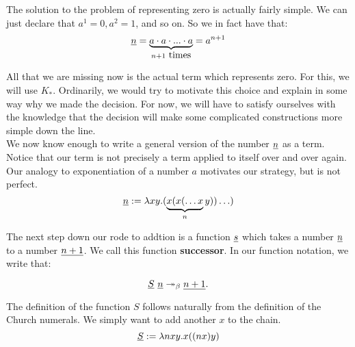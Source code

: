 The solution to the problem of representing zero is actually fairly simple. We can just declare that $a^1 = 0, a^2 = 1$, and so on. So we in fact have that:\\

\begin{equation*}
  \uline{n} = \underbrace{a \cdot a \cdot ... \cdot a}_{n+1\hbox{ times}} = a^{n+1}
\end{equation*}

All that we are missing now is the actual term which represents zero. For this, we will use $K_*$. Ordinarily, we would try to motivate this choice and explain in some way why we made the decision. For now, we will have to satisfy ourselves with the knowledge that the decision will make some complicated constructions more simple down the line.\\

We now know enough to write a general version of the number $\uline{n}$ as a term. Notice that our term is not precisely a term applied to itself over and over again. Our analogy to exponentiation of a number $a$ motivates our strategy, but is not perfect.\\

\begin{equation*}
  \uline{n} := \l xy . (\underbrace{x(x(\ldots x}_{n}y))\ldots)
\end{equation*}


The next step down our rode to addtion is a function $\uline{s}$ which takes a number $\uline{n}$ to a number $\uline{n+1}$. We call this function \textbf{successor}. In our function notation, we write that:

\begin{equation*}
  \uline{S}\ \uline{n} \twoheadrightarrow_\beta \uline{n + 1}.
\end{equation*}

The definition of the function $S$ follows naturally from the definition of the Church numerals. We simply want to add another $x$ to the chain.
\begin{equation*}
  \uline{S} := \l nxy.x((n x) y) 
\end{equation*}


